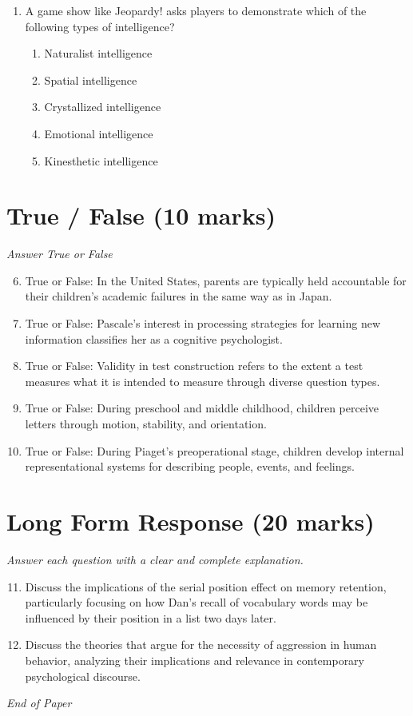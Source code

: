 \documentclass[12pt]{article}
\begin{document}
\begin{enumerate}[label=\arabic*.]
\begin{enumerate}[label=(\alph*)]
    \item nine
    \item ten
    \item eight
    \item one
\end{enumerate}
\item A game show like Jeopardy! asks players to demonstrate which of the following types of intelligence?
\begin{enumerate}[label=(\alph*)]
    \item Naturalist intelligence
    \item Spatial intelligence
    \item Crystallized intelligence
    \item Emotional intelligence
    \item Kinesthetic intelligence
\end{enumerate}
\end{enumerate}

\section*{True / False (10 marks)}
\textit{Answer True or False}
\begin{enumerate}[label=\arabic*.]
\setcounter{enumi}{5}
\item True or False: In the United States, parents are typically held accountable for their children's academic failures in the same way as in Japan.
\item True or False: Pascale's interest in processing strategies for learning new information classifies her as a cognitive psychologist.
\item True or False: Validity in test construction refers to the extent a test measures what it is intended to measure through diverse question types.
\item True or False: During preschool and middle childhood, children perceive letters through motion, stability, and orientation.
\item True or False: During Piaget's preoperational stage, children develop internal representational systems for describing people, events, and feelings.
\end{enumerate}

\section*{Long Form Response (20 marks)}
\textit{Answer each question with a clear and complete explanation.}
\begin{enumerate}[label=\arabic*.]
\setcounter{enumi}{10}
\item Discuss the implications of the serial position effect on memory retention, particularly focusing on how Dan's recall of vocabulary words may be influenced by their position in a list two days later.
\item Discuss the theories that argue for the necessity of aggression in human behavior, analyzing their implications and relevance in contemporary psychological discourse.
\end{enumerate}

\vfill
\noindent\textit{End of Paper}
\end{document}
